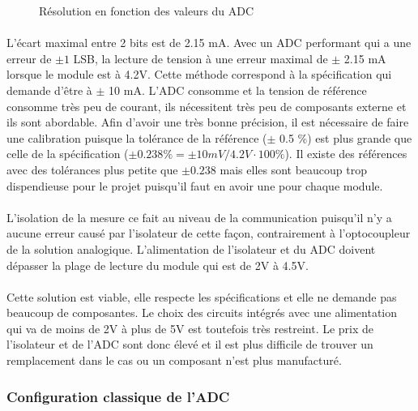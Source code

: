 \begin{figure}[H]
\begin{minipage}{0.45\textwidth}
			\caption{Résolution en fonction des valeurs du ADC}
			\label{fig:res_vref}
		\end{minipage}	
	\end{figure}	
	
	\paragraph*{}
	L'écart maximal entre 2 bits est de 2.15 mA. Avec un ADC performant qui a une erreur de $\pm 1$ LSB, la lecture de tension à une erreur maximal de $\pm $ 2.15 mA lorsque le module est à 4.2V. Cette méthode correspond à la spécification qui demande d'être à $\pm $ 10 mA. L'ADC consomme et la tension de référence consomme très peu de courant, ils nécessitent très peu de composants externe et ils sont abordable. Afin d'avoir une très bonne précision, il est nécessaire de faire une calibration puisque la tolérance de la référence ($\pm$ 0.5 \%) est plus grande que celle de la spécification ($\pm 0.238 \% = \pm 10mV / 4.2V \cdot 100 \%$). Il existe des références avec des tolérances plus petite que $\pm 0.238$ mais elles sont beaucoup trop dispendieuse pour le projet puisqu'il faut en avoir une pour chaque module.    
	
	\paragraph*{}
	L'isolation de la mesure ce fait au niveau de la communication puisqu'il n'y a aucune erreur causé par l'isolateur de cette façon, contrairement à l'optocoupleur de la solution analogique. L'alimentation de l'isolateur et du ADC doivent dépasser la plage de lecture du module qui est de 2V à 4.5V.
	
	\paragraph*{}
	Cette solution est viable, elle respecte les spécifications et elle ne demande pas beaucoup de composantes. Le choix des circuits intégrés avec une alimentation qui va de moins de 2V à plus de 5V est toutefois très restreint. Le prix de l'isolateur et de l'ADC sont donc élevé et il est plus difficile de trouver un remplacement dans le cas ou un composant n'est plus manufacturé.   
	
	\subsubsection*{Configuration classique de l'ADC}
	\paragraph*{}
	
	
	
	
	
	
	
	
	
	
	
	
	
	
	
	
	
	
	
	
	
	
	